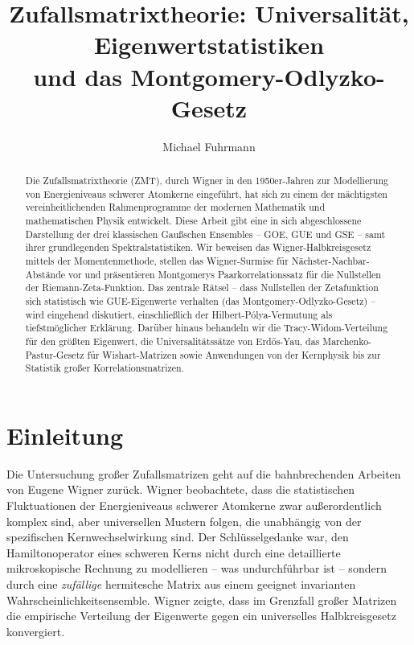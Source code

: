 \documentclass[12pt,a4paper]{amsart}
\author{Michael Fuhrmann}
\theoremstyle{definition}
\theoremstyle{remark}
\begin{document}
\title{Zufallsmatrixtheorie: Universalität, Eigenwertstatistiken\\
und das Montgomery-Odlyzko-Gesetz}

\begin{abstract}
Die Zufallsmatrixtheorie (ZMT), durch Wigner in den 1950er-Jahren zur
Modellierung von Energieniveaus schwerer Atomkerne eingeführt, hat sich zu
einem der mächtigsten vereinheitlichenden Rahmenprogramme der modernen
Mathematik und mathematischen Physik entwickelt. Diese Arbeit gibt eine
in sich abgeschlossene Darstellung der drei klassischen Gaußschen
Ensembles -- GOE, GUE und GSE -- samt ihrer grundlegenden Spektralstatistiken.
Wir beweisen das Wigner-Halbkreisgesetz mittels der Momentenmethode,
stellen das Wigner-Surmise für Nächster-Nachbar-Abstände vor und präsentieren
Montgomerys Paarkorrelationssatz für die Nullstellen der Riemann-Zeta-Funktion.
Das zentrale Rätsel -- dass Nullstellen der Zetafunktion sich statistisch
wie GUE-Eigenwerte verhalten (das Montgomery-Odlyzko-Gesetz) -- wird
eingehend diskutiert, einschließlich der Hilbert-Pólya-Vermutung als tiefstmöglicher
Erklärung. Darüber hinaus behandeln wir die Tracy-Widom-Verteilung für
den größten Eigenwert, die Universalitätssätze von Erdős-Yau, das
Marchenko-Pastur-Gesetz für Wishart-Matrizen sowie Anwendungen von der
Kernphysik bis zur Statistik großer Korrelationsmatrizen.
\end{abstract}

\maketitle

\tableofcontents

\section{Einleitung}

Die Untersuchung großer Zufallsmatrizen geht auf die bahnbrechenden Arbeiten
von Eugene Wigner \cite{Wigner1955} zurück. Wigner beobachtete, dass die
statistischen Fluktuationen der Energieniveaus schwerer Atomkerne zwar
außerordentlich komplex sind, aber universellen Mustern folgen, die unabhängig
von der spezifischen Kernwechselwirkung sind. Der Schlüsselgedanke war,
den Hamiltonoperator eines schweren Kerns nicht durch eine detaillierte
mikroskopische Rechnung zu modellieren -- was undurchführbar ist -- sondern
durch eine \emph{zufällige} hermitesche Matrix aus einem geeignet invarianten
Wahrscheinlichkeitsensemble. Wigner zeigte, dass im Grenzfall großer Matrizen
die empirische Verteilung der Eigenwerte gegen ein universelles Halbkreisgesetz
konvergiert.
\end{document}
